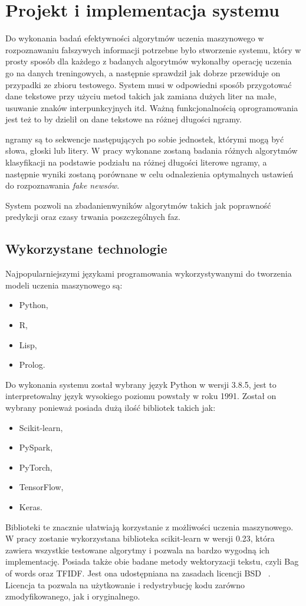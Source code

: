 \chapter{Projekt i implementacja systemu}
Do wykonania badań efektywności algorytmów uczenia maszynowego w rozpoznawaniu
fałszywych informacji potrzebne było stworzenie systemu, który w prosty sposób 
dla każdego z badanych algorytmów wykonałby operację uczenia go na danych treningowych,
a następnie sprawdził jak dobrze przewiduje on przypadki ze zbioru testowego.
System musi w odpowiedni sposób przygotować dane tekstowe przy użyciu metod takich jak zamiana dużych liter na małe, usuwanie znaków interpunkcyjnych itd.
Ważną funkcjonalnością oprogramowania jest też to by dzielił on dane tekstowe na 
różnej długości ngramy. 

ngramy są to sekwencje następujących po sobie jednostek, którymi mogą być słowa, 
głoski lub litery. W pracy wykonane zostaną badania różnych algorytmów klasyfikacji
na podstawie podziału na różnej długości literowe ngramy, a następnie wyniki zostaną
porównane w celu odnalezienia optymalnych ustawień do rozpoznawania \textit{fake newsów}.

System pozwoli na zbadanienwyników algorytmów takich jak poprawność predykcji oraz 
czasy trwania poszczególnych faz.

\section{Wykorzystane technologie}
Najpopularniejszymi językami programowania wykorzystywanymi do tworzenia modeli uczenia
maszynowego są:
\begin{itemize}
    \item Python,
    \item R,
    \item Lisp,
    \item Prolog.
\end{itemize}
Do wykonania systemu został wybrany język Python w wersji 3.8.5, jest to interpretowalny
język wysokiego poziomu powstały w roku 1991. Został on wybrany 
ponieważ posiada dużą ilość bibliotek takich jak: 
\begin{itemize}
    \item Scikit-learn,
    \item PySpark,
    \item PyTorch,
    \item TensorFlow,
    \item Keras.
\end{itemize}
Biblioteki te znacznie ułatwiają korzystanie z możliwości uczenia maszynowego.
W pracy zostanie wykorzystana biblioteka scikit-learn w wersji 0.23, która zawiera wszystkie 
testowane algorytmy i pozwala na bardzo wygodną ich implementację. Posiada także obie 
badane metody wektoryzacji tekstu, czyli Bag of words oraz TFIDF. Jest ona udostępniana na zasadach licencji BSD ~\cite{scikitlearn}. 
Licencja ta pozwala na użytkowanie i redystrybucję kodu zarówno zmodyfikowanego, jak i oryginalnego.

